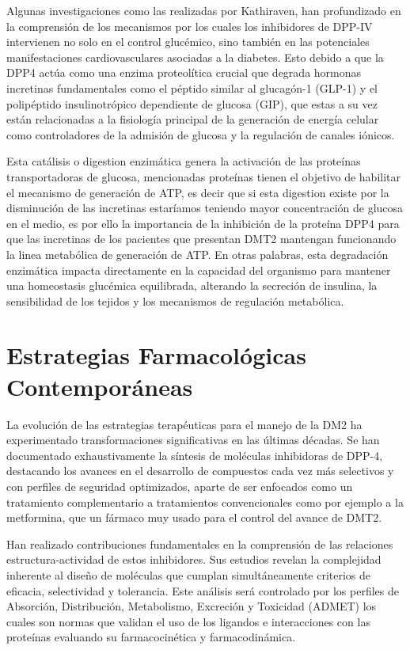  Algunas investigaciones como las realizadas por Kathiraven, han profundizado en la comprensión de los mecanismos por los cuales los inhibidores de DPP-IV intervienen no solo en el control glucémico, sino también en las potenciales manifestaciones cardiovasculares asociadas a la diabetes.%
 Esto debido a que la DPP4 actúa como una enzima proteolítica crucial que degrada hormonas incretinas fundamentales como el péptido similar al glucagón-1 (GLP-1) y el polipéptido insulinotrópico dependiente de glucosa (GIP), que estas a su vez están relacionadas a la fisiología principal de la generación de energía celular como controladores de la admisión de glucosa y la regulación de canales iónicos.
 
 Esta catálisis o digestion enzimática genera la activación de las proteínas transportadoras de glucosa, mencionadas proteínas tienen el objetivo de habilitar el mecanismo de generación de ATP, es decir que si esta digestion existe por la disminución de las incretinas estaríamos teniendo mayor concentración de glucosa en el medio, es por ello la importancia de la inhibición de la proteína DPP4 para que las incretinas de los pacientes que presentan DMT2 mantengan funcionando la linea metabólica de generación de ATP. En otras palabras, esta degradación enzimática impacta directamente en la capacidad del organismo para mantener una homeostasis glucémica equilibrada, alterando la secreción de insulina, la sensibilidad de los tejidos y los mecanismos de regulación metabólica.

 \section {Estrategias Farmacológicas Contemporáneas}
 La evolución de las estrategias terapéuticas para el manejo de la DM2 ha experimentado transformaciones significativas en las últimas décadas. %
 Se han documentado exhaustivamente la síntesis de moléculas inhibidoras de DPP-4, destacando los avances en el desarrollo de compuestos cada vez más selectivos y con perfiles de seguridad optimizados, aparte de ser enfocados como un tratamiento complementario a tratamientos convencionales como por ejemplo a la metformina, que un fármaco muy usado para el control del avance de DMT2.
 
 Han realizado contribuciones fundamentales en la comprensión de las relaciones estructura-actividad de estos inhibidores. Sus estudios revelan la complejidad inherente al diseño de moléculas que cumplan simultáneamente criterios de eficacia, selectividad y tolerancia.%
 Este análisis será controlado por los perfiles de Absorción, Distribución,
 Metabolismo, Excreción y Toxicidad (ADMET) los cuales son normas que validan el uso de los ligandos e interacciones con las proteínas evaluando su farmacocinética y farmacodinámica. 
 
